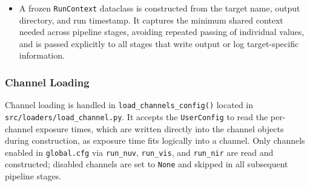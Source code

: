 \begin{itemize}
\begin{itemize}
                    \texttt{get\_user\_parameter\_path()} determines which parameter file to use: if a path is passed as a command-line argument it is used directly, otherwise \texttt{input/pa\-rameters.txt} is loaded as the default. At most one argument is accepted; if too many arguments are passed or the file is missing, the simulator prints a usage message and exits with code 1.
          \end{itemize}

    \item A frozen \texttt{RunContext} dataclass is constructed from the target name, output directory, and run timestamp. It captures the minimum shared context needed across pipeline stages, avoiding repeated passing of individual values, and is passed explicitly to all stages that write output or log target-specific information.
\end{itemize}

\subsubsection{Channel Loading}
\label{sec:channel_loading}

Channel loading is handled in \texttt{load\_channels\_config()} located in \texttt{src/loaders/load\_channel.py}. It accepts the \texttt{UserConfig} to read the per-channel exposure times, which are written directly into the channel objects during construction, as exposure time fits logically into a channel. Only channels enabled in \texttt{global.cfg} via \texttt{run\_nuv}, \texttt{run\_vis}, and \texttt{run\_nir} are read and constructed; disabled channels are set to \texttt{None} and skipped in all subsequent pipeline stages.

